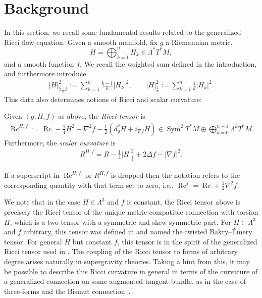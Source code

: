 \documentclass[11pt]{article}
\numberwithin{equation}{section}
\numberwithin{equation}{section}
\newcommand{\brs}[1]{\left| #1 \right|}
\newcommand{\gD}{\Delta}
\newcommand{\N}{\nabla}
\newcommand{\wnorm}[1]{\left|#1\right|^2_{\frac1k}}
\newcommand{\wwnorm}[1]{\left|#1\right|^2_{\frac{k-1}k}}
\DeclareMathOperator{\Sym}{Sym}
\DeclareMathOperator{\Rc}{Rc}
\begin{document}
\section{Background}

In this section, we recall some fundamental results related to the generalized Ricci flow equation. Given a smooth manifold, fix $g$ a Riemannian metric, \[H = \bigoplus_{k=1}^n H_k \in \Lambda^* T^* M,\] and a smooth function $f$. We recall the weighted sum defined in the introduction, and furthermore introduce
\begin{align*}
 \wwnorm{H}:= \sum_{k=1}^n\frac{k-1}k|H_k|^2, \qquad \wnorm{H} := \sum_{k=1}^n \frac{1}{k} \brs{H_k}^2.
\end{align*}
This data also determines notions of Ricci and scalar curvature:
\begin{defn} Given $(g, H, f)$ as above, the \emph{Ricci tensor} is
\begin{align*}
 \Rc^{H,f} := \Rc - \frac{1}{4} H^2 + \N^2 f - \frac{1}{2} \left( d^*_g H + i_{\N f} H \right) \in \Sym^2 T^* M \oplus \bigoplus_{k=0}^{n-1} \Lambda^k T^* M.
\end{align*}
Furthermore, the \emph{scalar curvature} is
\begin{align*}
 R^{H,f} = R - \frac{1}{4} \wnorm{H} + 2 \gD f - \brs{\N f}^2.
\end{align*}
\end{defn}

\begin{rmk} If a superscript in $\Rc^{H,f}$ or $R^{H,f}$ is dropped then the notation refers to the corresponding quantity with that term set to zero, i.e., $\Rc^f = \Rc + \frac{1}{2} \N^2 f$.
\end{rmk}

We note that in the case $H \in \Lambda^3$ and $f$ is constant, the Ricci tensor above is precisely the Ricci tensor of the unique metric-compatible connection with torsion $H$, which is a two-tensor with a symmetric and skew-symmetric part. For $H \in \Lambda^3$ and $f$ arbitrary, this tensor was defined in \cite{Streetsscalar} and named the twisted Bakry--\'Emery tensor. For general $H$ but constant $f$, this tensor is in the spirit of the generalized Ricci tensor used in \cite{FNS}. The coupling of the Ricci tensor to forms of arbitrary degree arises naturally in supergravity theories. Taking a hint from this, it may be possible to describe this Ricci curvature in general in terms of the curvature of a generalized connection on some augmented tangent bundle, as in the case of three-forms and the Bismut connection~\cite{GRFbook}.
\end{document}

